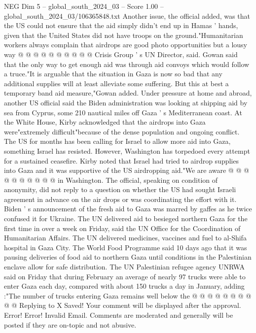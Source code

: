 \begin{textsample}{NEG Dim 5 – global\_south\_2024\_03 – Score 1.00 – global\_south\_2024\_03/106365848.txt}
Another issue, the official added, was that the US could not ensure that the aid simply didn't end up in Hamas ' hands, given that the United States did not have troops on the ground."Humanitarian workers always complain that airdrops are good photo opportunities but a lousy way @ @ @ @ @ @ @ @ @ @ Crisis Group ' s UN Director, said.
Gowan said that the only way to get enough aid was through aid convoys which would follow a truce."It is arguable that the situation in Gaza is now so bad that any additional supplies will at least alleviate some suffering.
But this at best a temporary band aid measure,"Gowan added.
Under pressure at home and abroad, another US official said the Biden administration was looking at shipping aid by sea from Cyprus, some 210 nautical miles off Gaza ' s Mediterranean coast.
At the White House, Kirby acknowledged that the airdrops into Gaza were"extremely difficult"because of the dense population and ongoing conflict.
The US for months has been calling for Israel to allow more aid into Gaza, something Israel has resisted.
However, Washington has torpedoed every attempt for a sustained ceasefire.
Kirby noted that Israel had tried to airdrop supplies into Gaza and it was supportive of the US airdropping aid."We are aware @ @ @ @ @ @ @ @ @ @ in Washington.
The official, speaking on condition of anonymity, did not reply to a question on whether the US had sought Israeli agreement in advance on the air drops or was coordinating the effort with it.
Biden ' s announcement of the fresh aid to Gaza was marred by gaffes as he twice confused it for Ukraine.
The UN delivered aid to besieged northern Gaza for the first time in over a week on Friday, said the UN Office for the Coordination of Humanitarian Affairs.
The UN delivered medicines, vaccines and fuel to al-Shifa hospital in Gaza City.
The World Food Programme said 10 days ago that it was pausing deliveries of food aid to northern Gaza until conditions in the Palestinian enclave allow for safe distribution.
The UN Palestinian refugee agency UNRWA said on Friday that during February an average of nearly 97 trucks were able to enter Gaza each day, compared with about 150 trucks a day in January, adding :"The number of trucks entering Gaza remains well below the @ @ @ @ @ @ @ @ @ @ Replying to X Saved!
Your comment will be displayed after the approval.
Error!
Error!
Invalid Email.
Comments are moderated and generally will be posted if they are on-topic and not abusive.

\end{textsample}

